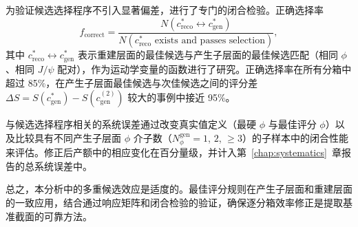 为验证候选选择程序不引入显著偏差，进行了专门的闭合检验。正确选择率
\begin{equation}
\label{eq:correct-choice-fraction}
f_{\mathrm{correct}} = \frac{N(c_{\mathrm{reco}}^{*} \leftrightarrow c_{\mathrm{gen}}^{*})}
                            {N(c_{\mathrm{reco}}^{*} \text{ exists and passes selection})},
\end{equation}
其中 $c_{\mathrm{reco}}^{*} \leftrightarrow c_{\mathrm{gen}}^{*}$ 表示重建层面的最佳候选与产生子层面的最佳候选匹配（相同 $\phi$、相同 $J/\psi$ 配对），作为运动学变量的函数进行了研究。正确选择率在所有分箱中超过 85\%，在产生子层面最佳候选与次佳候选之间的评分差 $\Delta S = S(c_{\mathrm{gen}}^{*}) - S(c_{\mathrm{gen}}^{(2)})$ 较大的事例中接近 95\%。

与候选选择程序相关的系统误差通过改变真实值定义（最硬 $\phi$ 与最佳评分 $\phi$）以及比较具有不同产生子层面 $\phi$ 介子数（$N_{\phi}^{\mathrm{gen}} = 1$, $2$, $\ge 3$）的子样本中的闭合性能来评估。修正后产额中的相应变化在百分量级，并计入第~\ref{chap:systematics}~章报告的总系统误差中。

总之，本分析中的多重候选效应是适度的。最佳评分规则在产生子层面和重建层面的一致应用，结合通过响应矩阵和闭合检验的验证，确保逐分箱效率修正是提取基准截面的可靠方法。
